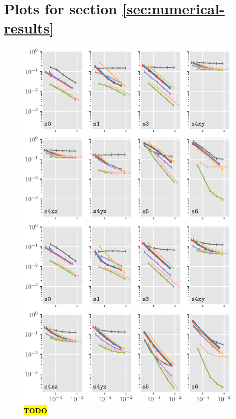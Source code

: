 \documentclass[sisc-eikonal.tex]{subfiles}
\begin{document}
\section{Plots for section \ref{sec:numerical-results}}

\begin{figure}[H]
  \centering
  \includegraphics[width=\linewidth]{plots_2d.eps}
  \caption{\hl{\textbf{TODO}}}
\end{figure}
\end{document}
